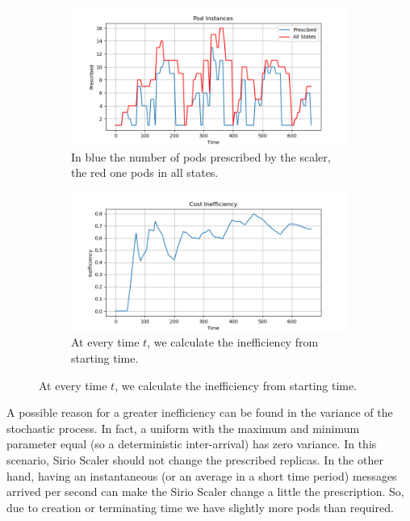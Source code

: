 \begin{figure}
    \centering
    \begin{subfigure}{0.85\textwidth}
        \centering
        \includegraphics[width=\textwidth]{images/Exponential_Fast/pods.png}
        \caption{In blue the number of pods prescribed by the scaler, the red one pods in all states.}
        \label{fig:exponential_fast_pods}
    \end{subfigure}
    \begin{subfigure}{0.85\textwidth}
        \includegraphics[width=\linewidth]{images/Exponential_Fast/inefficiency_cumulative.png}
        \caption{At every time $t$, we calculate the inefficiency from starting time.}
        \label{fig:exponential_fast_inefficiency}
    \end{subfigure}
\end{figure}

A possible reason for a greater inefficiency can be found in the variance of the stochastic process. In fact, a uniform with the maximum and minimum parameter equal (so a deterministic inter-arrival) has zero variance. In this scenario, Sirio Scaler should not change the prescribed replicas. In the other hand, having an instantaneous (or an average in a short time period) messages arrived per second can make the Sirio Scaler change a little the prescription. So, due to creation or terminating time we have slightly more pods than required.

